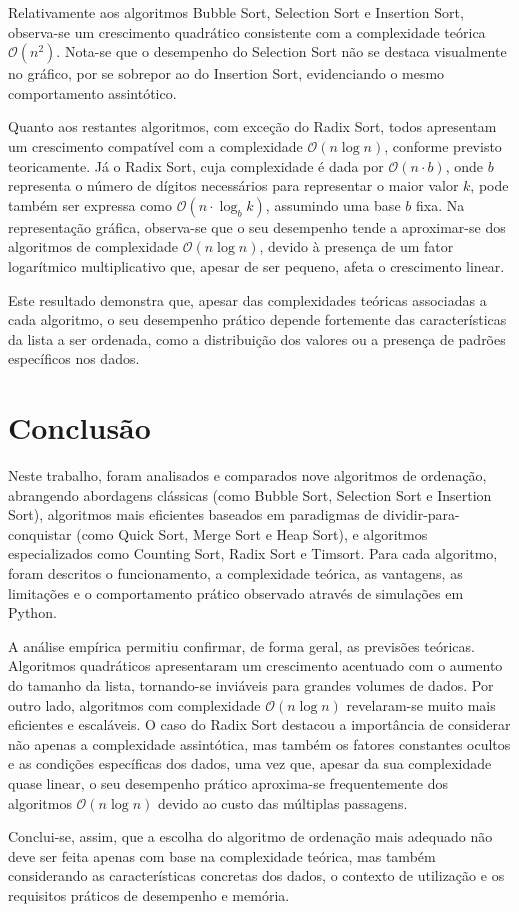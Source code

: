 \documentclass[conference]{IEEEtran}
\begin{document}
Relativamente aos algoritmos Bubble Sort, Selection Sort e Insertion Sort, observa-se um crescimento quadrático consistente com a complexidade teórica \( \mathcal{O}(n^2) \). Nota-se que o desempenho do Selection Sort não se destaca visualmente no gráfico, por se sobrepor ao do Insertion Sort, evidenciando o mesmo comportamento assintótico.

Quanto aos restantes algoritmos, com exceção do Radix Sort, todos apresentam um crescimento compatível com a complexidade \( \mathcal{O}(n \log n) \), conforme previsto teoricamente. Já o Radix Sort, cuja complexidade é dada por \( \mathcal{O}(n \cdot b) \), onde \( b \) representa o número de dígitos necessários para representar o maior valor \( k \), pode também ser expressa como \( \mathcal{O}(n \cdot \log_b k) \), assumindo uma base \( b \) fixa. Na representação gráfica, observa-se que o seu desempenho tende a aproximar-se dos algoritmos de complexidade \( \mathcal{O}(n \log n) \), devido à presença de um fator logarítmico multiplicativo que, apesar de ser pequeno, afeta o crescimento linear.

Este resultado demonstra que, apesar das complexidades teóricas associadas a cada algoritmo, o seu desempenho prático depende fortemente das características da lista a ser ordenada, como a distribuição dos valores ou a presença de padrões específicos nos dados.

\section{Conclusão}

Neste trabalho, foram analisados e comparados nove algoritmos de ordenação, abrangendo abordagens clássicas (como Bubble Sort, Selection Sort e Insertion Sort), algoritmos mais eficientes baseados em paradigmas de dividir-para-conquistar (como Quick Sort, Merge Sort e Heap Sort), e algoritmos especializados como Counting Sort, Radix Sort e Timsort. Para cada algoritmo, foram descritos o funcionamento, a complexidade teórica, as vantagens, as limitações e o comportamento prático observado através de simulações em Python.

A análise empírica permitiu confirmar, de forma geral, as previsões teóricas. Algoritmos quadráticos apresentaram um crescimento acentuado com o aumento do tamanho da lista, tornando-se inviáveis para grandes volumes de dados. Por outro lado, algoritmos com complexidade \( \mathcal{O}(n \log n) \) revelaram-se muito mais eficientes e escaláveis. O caso do Radix Sort destacou a importância de considerar não apenas a complexidade assintótica, mas também os fatores constantes ocultos e as condições específicas dos dados, uma vez que, apesar da sua complexidade quase linear, o seu desempenho prático aproxima-se frequentemente dos algoritmos \( \mathcal{O}(n \log n) \) devido ao custo das múltiplas passagens.

Conclui-se, assim, que a escolha do algoritmo de ordenação mais adequado não deve ser feita apenas com base na complexidade teórica, mas também considerando as características concretas dos dados, o contexto de utilização e os requisitos práticos de desempenho e memória.

\nocite{*}


\end{document}

